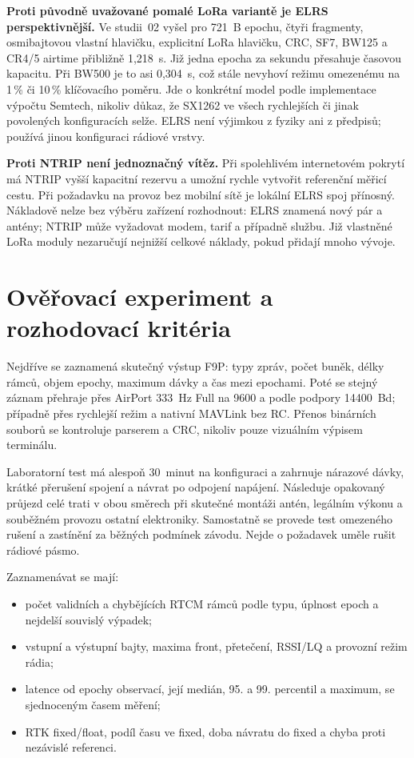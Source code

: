 \documentclass[11pt,a4paper]{article}
\begin{document}
\textbf{Proti původně uvažované pomalé LoRa variantě je ELRS perspektivnější.} Ve studii~02 vyšel pro 721~B epochu, čtyři fragmenty, osmibajtovou vlastní hlavičku, explicitní LoRa hlavičku, CRC, SF7, BW125 a CR4/5 airtime přibližně 1,218~s. Již jedna epocha za sekundu přesahuje časovou kapacitu. Při BW500 je to asi 0,304~s, což stále nevyhoví režimu omezenému na 1\,\% či 10\,\% klíčovacího poměru. Jde o konkrétní model podle implementace výpočtu Semtech,\cite{semtech} nikoliv důkaz, že SX1262 ve všech rychlejších či jinak povolených konfiguracích selže. ELRS není výjimkou z fyziky ani z předpisů; používá jinou konfiguraci rádiové vrstvy.

\textbf{Proti NTRIP není jednoznačný vítěz.} Při spolehlivém internetovém pokrytí má NTRIP vyšší kapacitní rezervu a umožní rychle vytvořit referenční měřicí cestu. Při požadavku na provoz bez mobilní sítě je lokální ELRS spoj přínosný. Nákladově nelze bez výběru zařízení rozhodnout: ELRS znamená nový pár a antény; NTRIP může vyžadovat modem, tarif a případně službu. Již vlastněné LoRa moduly nezaručují nejnižší celkové náklady, pokud přidají mnoho vývoje.

\section{Ověřovací experiment a rozhodovací kritéria}
Nejdříve se zaznamená skutečný výstup F9P: typy zpráv, počet buněk, délky rámců, objem epochy, maximum dávky a čas mezi epochami. Poté se stejný záznam přehraje přes AirPort 333~Hz Full na 9600 a podle podpory 14400~Bd; případně přes rychlejší režim a nativní MAVLink bez RC. Přenos binárních souborů se kontroluje parserem a CRC, nikoliv pouze vizuálním výpisem terminálu.

Laboratorní test má alespoň 30~minut na konfiguraci a zahrnuje nárazové dávky, krátké přerušení spojení a návrat po odpojení napájení. Následuje opakovaný průjezd celé trati v obou směrech při skutečné montáži antén, legálním výkonu a souběžném provozu ostatní elektroniky. Samostatně se provede test omezeného rušení a zastínění za běžných podmínek závodu. Nejde o požadavek uměle rušit rádiové pásmo.

Zaznamenávat se mají:
\begin{itemize}
\item počet validních a chybějících RTCM rámců podle typu, úplnost epoch a nejdelší souvislý výpadek;
\item vstupní a výstupní bajty, maxima front, přetečení, RSSI/LQ a provozní režim rádia;
\item latence od epochy observací, její medián, 95. a 99. percentil a maximum, se sjednoceným časem měření;
\item RTK fixed/float, podíl času ve fixed, doba návratu do fixed a chyba proti nezávislé referenci.
\end{itemize}
\end{document}
